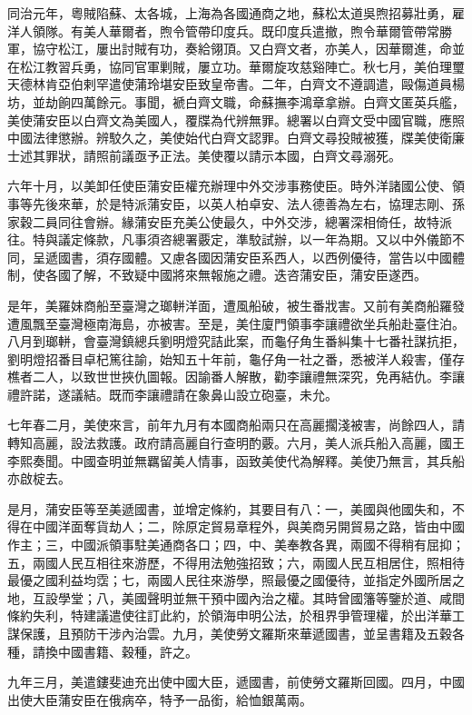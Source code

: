 \begin{pinyinscope}
同治元年，粵賊陷蘇、太各城，上海為各國通商之地，蘇松太道吳煦招募壯勇，雇洋人領隊。有美人華爾者，煦令管帶印度兵。既印度兵遣撤，煦令華爾管帶常勝軍，協守松江，屢出討賊有功，奏給翎頂。又白齊文者，亦美人，因華爾進，命並在松江教習兵勇，協同官軍剿賊，屢立功。華爾旋攻慈谿陣亡。秋七月，美伯理璽天德林肯亞伯剌罕遣使蒲玲堪安臣致皇帝書。二年，白齊文不遵調遣，毆傷道員楊坊，並劫餉四萬餘元。事聞，褫白齊文職，命蘇撫李鴻章拿辦。白齊文匿英兵艦，美使蒲安臣以白齊文為美國人，覆牒為代辨無罪。總署以白齊文受中國官職，應照中國法律懲辦。辨駮久之，美使始代白齊文認罪。白齊文尋投賊被獲，牒美使衛廉士述其罪狀，請照前議亟予正法。美使覆以請示本國，白齊文尋溺死。

六年十月，以美卸任使臣蒲安臣權充辦理中外交涉事務使臣。時外洋諸國公使、領事等先後來華，於是特派蒲安臣，以英人柏卓安、法人德善為左右，協理志剛、孫家穀二員同往會辦。緣蒲安臣充美公使最久，中外交涉，總署深相倚任，故特派往。特與議定條款，凡事須咨總署覈定，準駮試辦，以一年為期。又以中外儀節不同，呈遞國書，須存國體。又慮各國因蒲安臣系西人，以西例優待，當告以中國體制，使各國了解，不致疑中國將來無報施之禮。迭咨蒲安臣，蒲安臣遂西。

是年，美羅妹商船至臺灣之瑯軿洋面，遭風船破，被生番戕害。又前有美商船羅發遭風飄至臺灣極南海島，亦被害。至是，美住廈門領事李讓禮欲坐兵船赴臺住泊。八月到瑯軿，會臺灣鎮總兵劉明燈究詰此案，而龜仔角生番糾集十七番社謀抗拒，劉明燈招番目卓杞篤往諭，始知五十年前，龜仔角一社之番，悉被洋人殺害，僅存樵者二人，以致世世挾仇圖報。因諭番人解散，勸李讓禮無深究，免再結仇。李讓禮許諾，遂議結。既而李讓禮請在象鼻山設立砲臺，未允。

七年春二月，美使來言，前年九月有本國商船兩只在高麗擱淺被害，尚餘四人，請轉知高麗，設法救護。政府請高麗自行查明酌覈。六月，美人派兵船入高麗，國王李熙奏聞。中國查明並無羈留美人情事，函致美使代為解釋。美使乃無言，其兵船亦啟椗去。

是月，蒲安臣等至美遞國書，並增定條約，其要目有八：一，美國與他國失和，不得在中國洋面奪貨劫人；二，除原定貿易章程外，與美商另開貿易之路，皆由中國作主；三，中國派領事駐美通商各口；四，中、美奉教各異，兩國不得稍有屈抑；五，兩國人民互相往來游歷，不得用法勉強招致；六，兩國人民互相居住，照相待最優之國利益均霑；七，兩國人民往來游學，照最優之國優待，並指定外國所居之地，互設學堂；八，美國聲明並無干預中國內治之權。其時曾國籓等鑒於道、咸間條約失利，特建議遣使往訂此約，於領海申明公法，於租界爭管理權，於出洋華工謀保護，且預防干涉內治雲。九月，美使勞文羅斯來華遞國書，並呈書籍及五穀各種，請換中國書籍、穀種，許之。

九年三月，美遣鏤斐迪充出使中國大臣，遞國書，前使勞文羅斯回國。四月，中國出使大臣蒲安臣在俄病卒，特予一品銜，給恤銀萬兩。


\end{pinyinscope}

